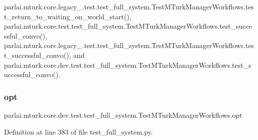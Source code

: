 parlai.\+mturk.\+core.\+legacy\+\_.\+test.\+test\+\_\+full\+\_\+system.\+Test\+M\+Turk\+Manager\+Workflows.\+test\+\_\+return\+\_\+to\+\_\+waiting\+\_\+on\+\_\+world\+\_\+start(), parlai.\+mturk.\+core.\+test.\+test\+\_\+full\+\_\+system.\+Test\+M\+Turk\+Manager\+Workflows.\+test\+\_\+successful\+\_\+convo(), parlai.\+mturk.\+core.\+legacy\+\_.\+test.\+test\+\_\+full\+\_\+system.\+Test\+M\+Turk\+Manager\+Workflows.\+test\+\_\+successful\+\_\+convo(), and parlai.\+mturk.\+core.\+dev.\+test.\+test\+\_\+full\+\_\+system.\+Test\+M\+Turk\+Manager\+Workflows.\+test\+\_\+successful\+\_\+convo().

\mbox{\label{classparlai_1_1mturk_1_1core_1_1dev_1_1test_1_1test__full__system_1_1TestMTurkManagerWorkflows_a0f790c60b129cb00158cd49ba707a6d2}} 
\subsubsection{\texorpdfstring{opt}{opt}}
{\footnotesize\ttfamily parlai.\+mturk.\+core.\+dev.\+test.\+test\+\_\+full\+\_\+system.\+Test\+M\+Turk\+Manager\+Workflows.\+opt}



Definition at line 383 of file test\+\_\+full\+\_\+system.\+py.



